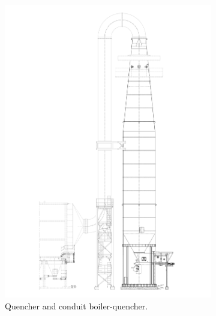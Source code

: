 \documentclass[a4paper,11pt ]{xc_webpage_project}
\renewcommand{\widhtLeftCol}{0.475\textwidth} %
\begin{document}
\begin{figure}[h]
  \begin{subfigure}[b]{\widhtLeftCol}
  \centering
  \includegraphics[width=\textwidth]{figures/quencher}
  \caption{Quencher and conduit boiler-quencher.}
  \end{subfigure}
\hfill
  \begin{subfigure}[b]{0.35\textwidth}
  \centering

\end{subfigure}
\end{figure}
\end{document}
